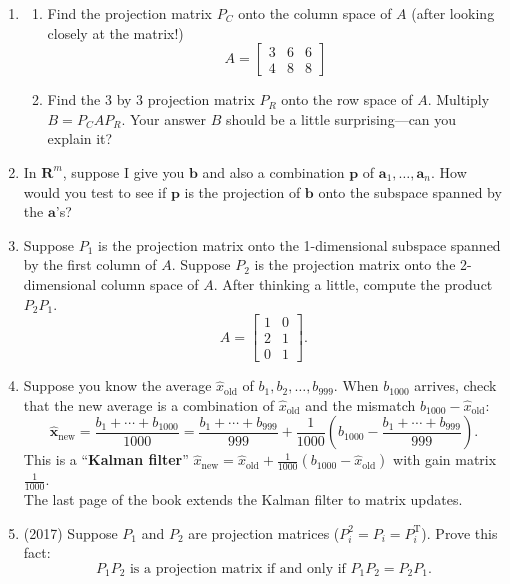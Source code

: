\documentclass[14pt, a4paper]{article}
\begin{document}
\begin{enumerate}[resume]
    \item
          \begin{enumerate}
              \item Find the projection matrix $P_C$ onto the column space of $A$ (after looking closely at the matrix!)
                    \[
                        A = \begin{bmatrix} 3 & 6 & 6 \\ 4 & 8 & 8 \end{bmatrix}
                    \]
              \item Find the 3 by 3 projection matrix $P_R$ onto the row space of $A$. Multiply $B = P_C A P_R$. Your answer $B$ should be a little surprising---can you explain it?
          \end{enumerate}

    \item In $\mathbf{R}^m$, suppose I give you $\boldsymbol{b}$ and also a combination $\boldsymbol{p}$ of $\boldsymbol{a}_1, \dots, \boldsymbol{a}_n$. How would you test to see if $\boldsymbol{p}$ is the projection of $\boldsymbol{b}$ onto the subspace spanned by the $\boldsymbol{a}$'s?

    \item Suppose $P_1$ is the projection matrix onto the 1-dimensional subspace spanned by the first column of $A$. Suppose $P_2$ is the projection matrix onto the 2-dimensional column space of $A$. After thinking a little, compute the product $P_2P_1$.
          \[
              A = \begin{bmatrix} 1 & 0 \\ 2 & 1 \\ 0 & 1 \end{bmatrix}.
          \]

    \item Suppose you know the average $\widehat{x}_{\mathrm{old}}$ of $b_1, b_2, \dots, b_{999}$. When $b_{1000}$ arrives, check that the new average is a combination of $\widehat{x}_{\mathrm{old}}$ and the mismatch $b_{1000} - \widehat{x}_{\mathrm{old}}$:
          \[
              \widehat{\boldsymbol{x}}_{\mathrm{new}} = \frac{b_1 + \cdots + b_{1000}}{1000} = \frac{b_1 + \cdots + b_{999}}{999} + \frac{1}{1000} \left( b_{1000} - \frac{b_1 + \cdots + b_{999}}{999} \right).
          \]
          This is a ``\textbf{Kalman filter}'' $\widehat{x}_{\mathrm{new}} = \widehat{x}_{\mathrm{old}} + \frac{1}{1000} (b_{1000} - \widehat{x}_{\mathrm{old}})$ with gain matrix $\frac{1}{1000}$. \\
          The last page of the book extends the Kalman filter to matrix updates.

    \item (2017) Suppose $P_1$ and $P_2$ are projection matrices ($P_i^2 = P_i = P_i^{\mathrm{T}}$). Prove this fact:
          \[
              P_1 P_2 \text{ is a projection matrix if and only if } P_1 P_2 = P_2 P_1.
          \]
\end{enumerate}
\end{document}
